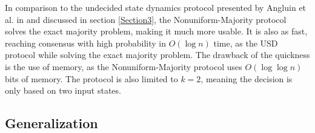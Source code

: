 In comparison to the undecided state dynamics protocol presented by Angluin et al. in \cite{angluinSimplePopulationProtocol2008} and discussed in section \ref{Section3}, the Nonuniform-Majority protocol solves the exact majority problem, making it much more usable. It is also as fast, reaching consensus with high probability in $O(\log n)$  time, as the USD protocol while solving the exact majority problem. The drawback of the quickness is the use of memory, as the Nonuniform-Majority protocol uses $O(\log \log n)$ bits of memory.  The protocol is also limited to $k = 2$, meaning the decision is only based on two input states. 

\subsection{Generalization}



